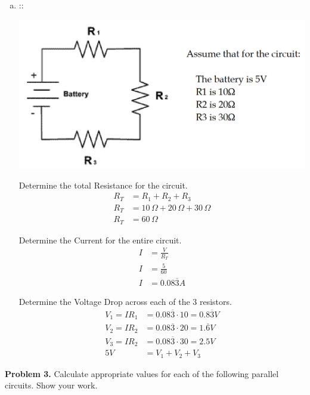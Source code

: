 \documentclass[11pt]{article}
\begin{document}
\begin{enumerate}[a)]
\item ::
\begin{center}
    \includegraphics[scale=0.2]{2b.png}
\end{center}
Determine the total Resistance for the circuit.
\begin{align*}
    R_T&=R_1+R_2+R_3 \\
    R_T&=10\,\Omega + 20\,\Omega + 30\,\Omega \\
    R_T&= 60\,\Omega
\end{align*}

Determine the Current for the entire circuit.
\begin{align*}
    I &= \frac{V}{R_T} \\
    I &= \frac{5}{60} \\
    I &= 0.08\overline{3}A
\end{align*}

Determine the Voltage Drop across each of the 3 resistors.
\begin{align*}
    V_1 = IR_1 &= 0.08\overline{3}\cdot10 = 0.8\overline{3}V \\
    V_2 = IR_2 &= 0.08\overline{3}\cdot20 = 1.\overline{6}V \\
    V_3 = IR_2 &= 0.08\overline{3}\cdot30 = 2.5V \\
    5V &= V_1 + V_2 + V_3
\end{align*}
\end{enumerate}
\pagebreak


\textbf{Problem 3.} Calculate appropriate values for each of the following parallel circuits. Show your work.
\end{document}
